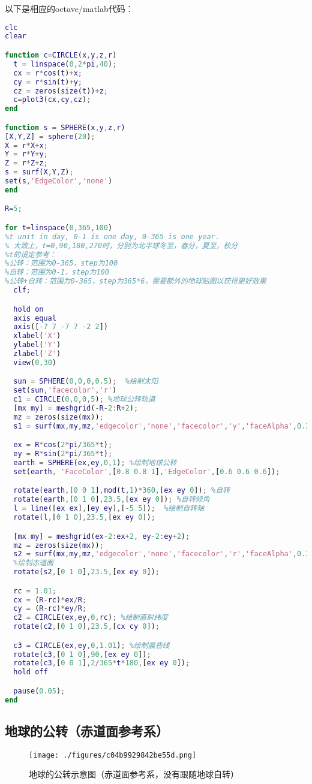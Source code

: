 以下是相应的octave/matlab代码：
\begin{lstlisting}[language=matlab]
clc
clear

function c=CIRCLE(x,y,z,r)
  t = linspace(0,2*pi,40);
  cx = r*cos(t)+x;
  cy = r*sin(t)+y;
  cz = zeros(size(t))+z;
  c=plot3(cx,cy,cz);
end

function s = SPHERE(x,y,z,r)
[X,Y,Z] = sphere(20);
X = r*X+x;
Y = r*Y+y;
Z = r*Z+z;
s = surf(X,Y,Z);
set(s,'EdgeColor','none')
end

R=5;

for t=linspace(0,365,100)
%t unit in day, 0-1 is one day, 0-365 is one year.
% 大致上，t=0,90,180,270时，分别为北半球冬至，春分，夏至，秋分
%t的设定参考：
%公转：范围为0-365，step为100
%自转：范围为0-1，step为100
%公转+自转：范围为0-365，step为365*6，需要额外的地球贴图以获得更好效果
  clf;

  hold on
  axis equal
  axis([-7 7 -7 7 -2 2])
  xlabel('X')
  ylabel('Y')
  zlabel('Z')
  view(0,30)

  sun = SPHERE(0,0,0,0.5);  %绘制太阳
  set(sun,'facecolor','r')
  c1 = CIRCLE(0,0,0,5); %地球公转轨道
  [mx my] = meshgrid(-R-2:R+2);
  mz = zeros(size(mx));
  s1 = surf(mx,my,mz,'edgecolor','none','facecolor','y','faceAlpha',0.3); %黄道面

  ex = R*cos(2*pi/365*t);
  ey = R*sin(2*pi/365*t);
  earth = SPHERE(ex,ey,0,1); %绘制地球公转
  set(earth, 'FaceColor',[0.8 0.8 1],'EdgeColor',[0.6 0.6 0.6]);

  rotate(earth,[0 0 1],mod(t,1)*360,[ex ey 0]); %自转
  rotate(earth,[0 1 0],23.5,[ex ey 0]); %自转倾角
  l = line([ex ex],[ey ey],[-5 5]);  %绘制自转轴
  rotate(l,[0 1 0],23.5,[ex ey 0]);

  [mx my] = meshgrid(ex-2:ex+2, ey-2:ey+2);
  mz = zeros(size(mx));
  s2 = surf(mx,my,mz,'edgecolor','none','facecolor','r','faceAlpha',0.3);
  %绘制赤道面
  rotate(s2,[0 1 0],23.5,[ex ey 0]);

  rc = 1.01;
  cx = (R-rc)*ex/R;
  cy = (R-rc)*ey/R;
  c2 = CIRCLE(ex,ey,0,rc); %绘制直射纬度
  rotate(c2,[0 1 0],23.5,[cx cy 0]);

  c3 = CIRCLE(ex,ey,0,1.01); %绘制晨昏线
  rotate(c3,[0 1 0],90,[ex ey 0]);
  rotate(c3,[0 0 1],2/365*t*180,[ex ey 0]);
  hold off

  pause(0.05);
end
\end{lstlisting}

\subsection{地球的公转（赤道面参考系）}
\begin{figure}[ht]
\centering
\texttt{[image: ./figures/c04b9929842be55d.png]}
\caption{地球的公转示意图（赤道面参考系，没有跟随地球自转）} \label{fig_georev_2}
\end{figure}

